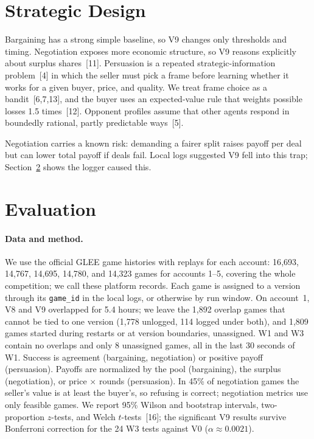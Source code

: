 \documentclass{article}
\begin{document}
\section{Strategic Design}

Bargaining has a strong simple baseline, so V9 changes only thresholds and timing. Negotiation exposes more economic structure, so V9 reasons explicitly about surplus shares~[11]. Persuasion is a repeated strategic-information problem~[4] in which the seller must pick a frame before learning whether it works for a given buyer, price, and quality. We treat frame choice as a bandit~[6,7,13], and the buyer uses an expected-value rule that weights possible losses 1.5 times~[12]. Opponent profiles assume that other agents respond in boundedly rational, partly predictable ways~[5].

Negotiation carries a known risk: demanding a fairer split raises payoff per deal but can lower total payoff if deals fail. Local logs suggested V9 fell into this trap; Section~\ref{sec:eval} shows the logger caused this.

\section{Evaluation}
\label{sec:eval}

\paragraph{Data and method.}
We use the official GLEE game histories with replays for each account: 16{,}693, 14{,}767, 14{,}695, 14{,}780, and 14{,}323 games for accounts 1--5, covering the whole competition; we call these platform records. Each game is assigned to a version through its \texttt{game\_id} in the local logs, or otherwise by run window. On account~1, V8 and V9 overlapped for 5.4 hours; we leave the 1{,}892 overlap games that cannot be tied to one version (1{,}778 unlogged, 114 logged under both), and 1{,}809 games started during restarts or at version boundaries, unassigned. W1 and W3 contain no overlaps and only 8 unassigned games, all in the last 30 seconds of W1. Success is agreement (bargaining, negotiation) or positive payoff (persuasion). Payoffs are normalized by the pool (bargaining), the surplus (negotiation), or price $\times$ rounds (persuasion). In 45\% of negotiation games the seller's value is at least the buyer's, so refusing is correct; negotiation metrics use only feasible games. We report 95\% Wilson and bootstrap intervals, two-proportion $z$-tests, and Welch $t$-tests~[16]; the significant V9 results survive Bonferroni correction for the 24 W3 tests against V0 ($\alpha\approx0.0021$).
\end{document}
